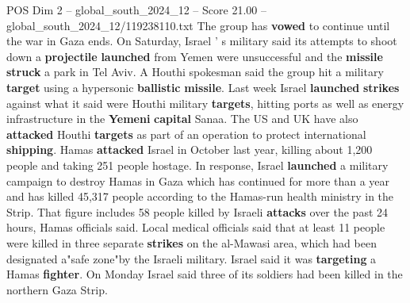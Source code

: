 \begin{textsample}{POS Dim 2 – global\_south\_2024\_12 – Score 21.00 – global\_south\_2024\_12/119238110.txt}
The group has \textbf{vowed} to continue until the war in Gaza ends.
On Saturday, Israel ' s military said its attempts to shoot down a \textbf{projectile} \textbf{launched} from Yemen were unsuccessful and the \textbf{missile} \textbf{struck} a park in Tel Aviv.
A Houthi spokesman said the group hit a military \textbf{target} using a hypersonic \textbf{ballistic} \textbf{missile}.
Last week Israel \textbf{launched} \textbf{strikes} against what it said were Houthi military \textbf{targets}, hitting ports as well as energy infrastructure in the \textbf{Yemeni} \textbf{capital} Sanaa.
The US and UK have also \textbf{attacked} Houthi \textbf{targets} as part of an operation to protect international \textbf{shipping}.
Hamas \textbf{attacked} Israel in October last year, killing about 1,200 people and taking 251 people hostage.
In response, Israel \textbf{launched} a military campaign to destroy Hamas in Gaza which has continued for more than a year and has killed 45,317 people according to the Hamas-run health ministry in the Strip.
That figure includes 58 people killed by Israeli \textbf{attacks} over the past 24 hours, Hamas officials said.
Local medical officials said that at least 11 people were killed in three separate \textbf{strikes} on the al-Mawasi area, which had been designated a"safe zone"by the Israeli military.
Israel said it was \textbf{targeting} a Hamas \textbf{fighter}.
On Monday Israel said three of its soldiers had been killed in the northern Gaza Strip.

\end{textsample}
